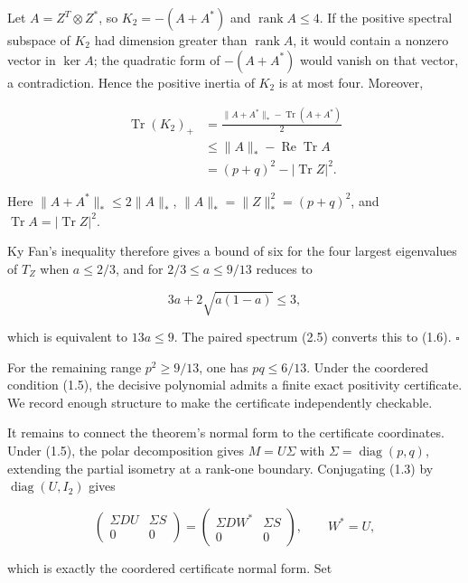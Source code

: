 \documentclass[11pt]{article}
\begin{document}
Let $A=Z^T\otimes Z^*$, so $K_2=-(A+A^*)$ and $\operatorname{rank}A\le4$. If the positive spectral subspace of $K_2$ had dimension greater than $\operatorname{rank}A$, it would contain a nonzero vector in $\ker A$; the quadratic form of $-(A+A^*)$ would vanish on that vector, a contradiction. Hence the positive inertia of $K_2$ is at most four. Moreover,

\begin{equation}
\begin{aligned}
\operatorname{Tr}(K_2)_+
&=\frac{\|A+A^*\|_*-\operatorname{Tr}(A+A^*)}{2}\\
&\le \|A\|_*-\operatorname{Re}\operatorname{Tr}A\\
&=(p+q)^2-|\operatorname{Tr}Z|^2.
\end{aligned}
\tag{4.1}
\end{equation}

Here $\|A+A^*\|_*\le2\|A\|_*$, $\|A\|_*=\|Z\|_*^2=(p+q)^2$, and $\operatorname{Tr}A=|\operatorname{Tr}Z|^2$.

Ky Fan's inequality therefore gives a bound of six for the four largest eigenvalues of $T_Z$ when $a\le2/3$, and for $2/3\le a\le9/13$ reduces to

\[
3a+2\sqrt{a(1-a)}\le3,
\]

which is equivalent to $13a\le9$. The paired spectrum (2.5) converts this to (1.6). $\square$

For the remaining range $p^2\ge9/13$, one has $pq\le6/13$. Under the coordered condition (1.5), the decisive polynomial admits a finite exact positivity certificate. We record enough structure to make the certificate independently checkable.

It remains to connect the theorem's normal form to the certificate coordinates. Under (1.5), the polar decomposition gives $M=U\Sigma$ with $\Sigma=\operatorname{diag}(p,q)$, extending the partial isometry at a rank-one boundary. Conjugating (1.3) by $\operatorname{diag}(U,I_2)$ gives

\begin{equation}
\begin{pmatrix}
\Sigma D U&\Sigma S\\0&0
\end{pmatrix}
=
\begin{pmatrix}
\Sigma D W^*&\Sigma S\\0&0
\end{pmatrix},
\qquad W^*=U,
\tag{4.2}
\end{equation}

which is exactly the coordered certificate normal form. Set
\end{document}

